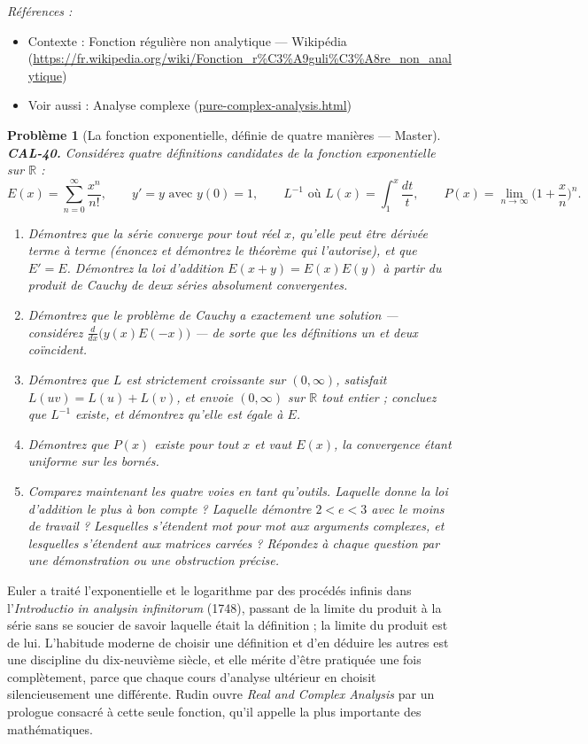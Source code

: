 \documentclass[11pt]{article}
\newtheorem{problem}{Problème}
\newenvironment{refs}{\par\small\noindent\emph{Références :}\begin{itemize}\setlength\itemsep{0pt}}{\end{itemize}\normalsize}
\begin{document}
\begin{refs}
\item Contexte : Fonction régulière non analytique --- Wikipédia (\url{https://fr.wikipedia.org/wiki/Fonction_r%C3%A9guli%C3%A8re_non_analytique})
\item Voir aussi : Analyse complexe (\url{pure-complex-analysis.html})
\end{refs}

\bigskip

\begin{problem}[{La fonction exponentielle, définie de quatre manières --- Master}]
\textbf{CAL-40.} Considérez quatre définitions candidates de la fonction exponentielle sur
$ \mathbb{R} $ :
\[ E(x) = \sum_{n=0}^{\infty} \frac{x^n}{n!}, \qquad
y' = y \text{ avec } y(0)=1, \qquad
L^{-1} \text{ où } L(x) = \int_1^{x} \frac{dt}{t}, \qquad
P(x) = \lim_{n\to\infty}\Big(1+\frac{x}{n}\Big)^n . \]
\begin{enumerate}
\item[(a)] Démontrez que la série converge pour tout réel $ x $, qu'elle peut être dérivée terme
à terme (énoncez et démontrez le théorème qui l'autorise), et que $ E' = E $. Démontrez la
loi d'addition $ E(x+y) = E(x)E(y) $ à partir du produit de Cauchy de deux séries absolument
convergentes.
\item[(b)] Démontrez que le problème de Cauchy a exactement une solution --- considérez
$ \frac{d}{dx}\big( y(x) E(-x) \big) $ --- de sorte que les définitions un et deux coïncident.
\item[(c)] Démontrez que $ L $ est strictement croissante sur $ (0,\infty) $, satisfait
$ L(uv) = L(u)+L(v) $, et envoie $ (0,\infty) $ sur $ \mathbb{R} $ tout entier ; concluez que
$ L^{-1} $ existe, et démontrez qu'elle est égale à $ E $.
\item[(d)] Démontrez que $ P(x) $ existe pour tout $ x $ et vaut $ E(x) $, la convergence étant
uniforme sur les bornés.
\item[(e)] Comparez maintenant les quatre voies en tant qu'outils. Laquelle donne la loi d'addition le plus à bon compte ? Laquelle
démontre $ 2 < e < 3 $ avec le moins de travail ? Lesquelles s'étendent mot pour mot aux arguments
complexes, et lesquelles s'étendent aux matrices carrées ? Répondez à chaque question par une démonstration ou une
obstruction précise.
\end{enumerate}

\end{problem}

\noindent Euler a traité l'exponentielle et le logarithme par des procédés infinis dans
l'\textit{Introductio in analysin infinitorum} (1748), passant de la limite du produit à la
série sans se soucier de savoir laquelle était la définition ; la limite du produit est de lui. L'habitude
moderne de choisir une définition et d'en déduire les autres est une discipline du dix-neuvième siècle, et elle
mérite d'être pratiquée une fois complètement, parce que chaque cours d'analyse ultérieur en choisit silencieusement une différente.
Rudin ouvre \textit{Real and Complex Analysis} par un prologue consacré à cette seule fonction,
qu'il appelle la plus importante des mathématiques.
\end{document}
